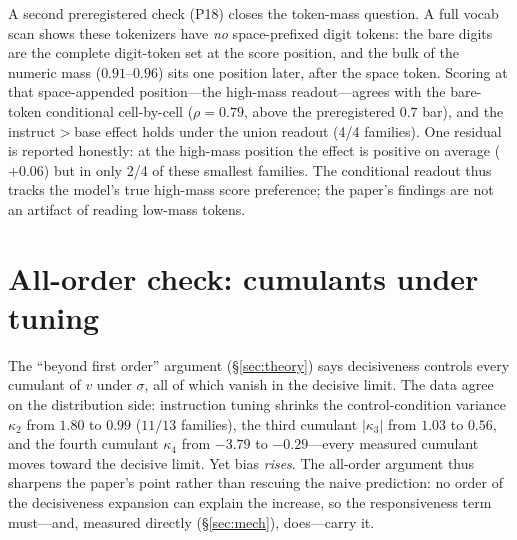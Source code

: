 \documentclass[11pt]{article}
\begin{document}
A second preregistered check (P18) closes the token-mass question. A full vocab
scan shows these tokenizers have \emph{no} space-prefixed digit tokens: the bare
digits are the complete digit-token set at the score position, and the bulk of the
numeric mass ($0.91$--$0.96$) sits one position later, after the space token.
Scoring at that space-appended position---the high-mass readout---agrees with the
bare-token conditional cell-by-cell ($\rho=0.79$, above the preregistered $0.7$
bar), and the instruct$>$base effect holds under the union readout (4/4 families).
One residual is reported honestly: at the high-mass position the effect is positive
on average ($+0.06$) but in only 2/4 of these smallest families. The conditional
readout thus tracks the model's true high-mass score preference; the paper's
findings are not an artifact of reading low-mass tokens.

\section{All-order check: cumulants under tuning}\label{app:cumulants}
The ``beyond first order'' argument (\S\ref{sec:theory}) says decisiveness controls
every cumulant of $v$ under $\sigma$, all of which vanish in the decisive limit. The
data agree on the distribution side: instruction tuning shrinks the control-condition
variance $\kappa_2$ from $1.80$ to $0.99$ ($11/13$ families), the third cumulant
$|\kappa_3|$ from $1.03$ to $0.56$, and the fourth cumulant $\kappa_4$ from $-3.79$
to $-0.29$---every measured cumulant moves toward the decisive limit. Yet bias
\emph{rises}. The all-order argument thus sharpens the paper's point rather than
rescuing the naive prediction: no order of the decisiveness expansion can explain the
increase, so the responsiveness term must---and, measured directly
(\S\ref{sec:mech}), does---carry it.
\end{document}
